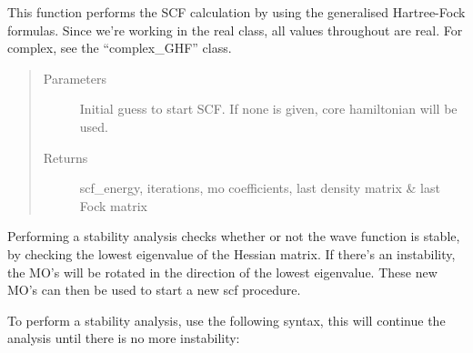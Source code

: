 \documentclass[letterpaper,10pt,english]{sphinxmanual}
\begin{document}
\begin{fulllineitems}
\begin{fulllineitems}
\begin{quote}
\begin{description}
\end{description}\end{quote}

\end{fulllineitems}


\begin{fulllineitems}
\label{\detokenize{Real_GHF:ghf.real_GHF.RealGHF.scf}}
This function performs the SCF calculation by using the generalised Hartree-Fock formulas. Since we’re working
in the real class, all values throughout are real. For complex, see the “complex\_GHF” class.
\begin{quote}\begin{description}
\item[{Parameters}] \leavevmode
{} \textendash{} Initial guess to start SCF. If none is given, core hamiltonian will be used.

\item[{Returns}] \leavevmode
scf\_energy, iterations, mo coefficients, last density matrix \& last Fock matrix

\end{description}\end{quote}

\end{fulllineitems}


\begin{fulllineitems}
\label{\detokenize{Real_GHF:ghf.real_GHF.RealGHF.stability}}
Performing a stability analysis checks whether or not the wave function is stable, by checking the lowest
eigenvalue of the Hessian matrix. If there’s an instability, the MO’s will be rotated in the direction
of the lowest eigenvalue. These new MO’s can then be used to start a new scf procedure.

To perform a stability analysis, use the following syntax, this will continue the analysis until there is
no more instability:


\end{fulllineitems}
\end{fulllineitems}
\end{document}
